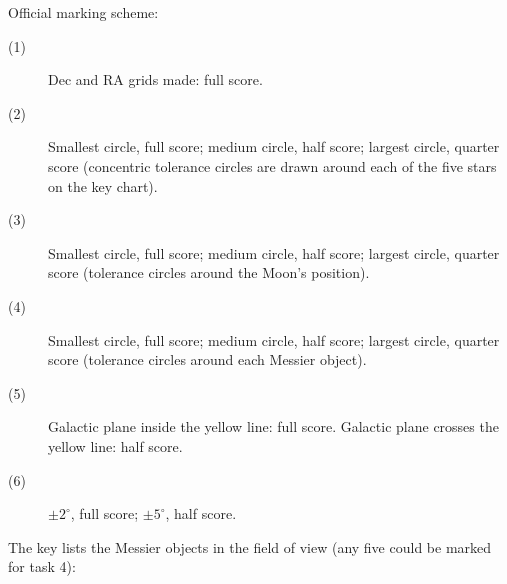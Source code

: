 Official marking scheme:

\begin{description}
\item[(1)] Dec and RA grids made: full score.
\item[(2)] Smallest circle, full score; medium circle, half score; largest
  circle, quarter score (concentric tolerance circles are drawn around each
  of the five stars on the key chart).
\item[(3)] Smallest circle, full score; medium circle, half score; largest
  circle, quarter score (tolerance circles around the Moon's position).
\item[(4)] Smallest circle, full score; medium circle, half score; largest
  circle, quarter score (tolerance circles around each Messier object).
\item[(5)] Galactic plane inside the yellow line: full score. Galactic
  plane crosses the yellow line: half score.
\item[(6)] $\pm 2^\circ$, full score; $\pm 5^\circ$, half score.
\end{description}




The key lists the Messier objects in the field of view (any five could be
marked for task 4):

